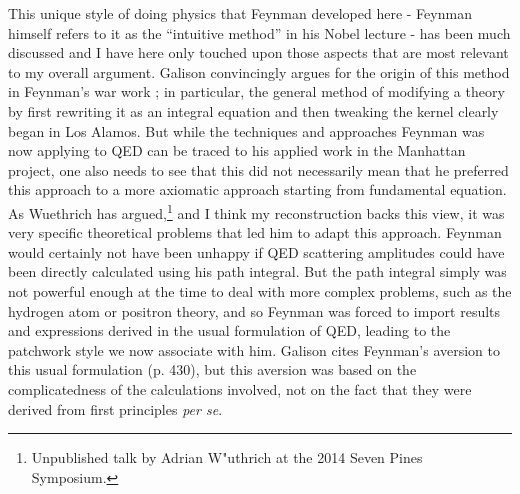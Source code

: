 \documentclass[12pt,a4paper]{article}
\begin{document}
This unique style of doing physics that Feynman developed here - Feynman himself refers to it as the ``intuitive method'' in his Nobel lecture - has been much discussed and I have here only touched upon those aspects that are most relevant to my overall argument. Galison convincingly argues for the origin of this method in Feynman's war work \citep{galison_1998_feynmans}; in particular, the general method of modifying a theory by first rewriting it as an integral equation and then tweaking the kernel clearly began in Los Alamos. But while the techniques and approaches Feynman was now applying to QED can be traced to his applied work in the Manhattan project, one also needs to see that this did not necessarily mean that he preferred this approach to a more axiomatic approach starting from fundamental equation. As Wuethrich has argued,\footnote{Unpublished talk by Adrian W"uthrich at the 2014 Seven Pines Symposium.} and I think my reconstruction backs this view, it was very specific theoretical problems that led him to adapt this approach. Feynman would certainly not have been unhappy if QED scattering amplitudes could have been directly calculated using his path integral. But the path integral simply was not powerful enough at the time to deal with more complex problems, such as the hydrogen atom or positron theory, and so Feynman was forced to import results and expressions derived in the usual formulation of QED, leading to the patchwork style we now associate with him. Galison cites Feynman's aversion to this usual formulation (p. 430), but this aversion was based on the complicatedness of the calculations involved, not on the fact that they were derived from first principles \emph{per se}.
\end{document}
